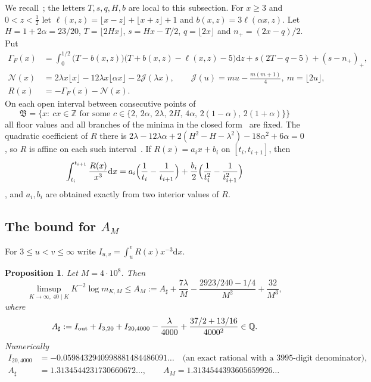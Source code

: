 \documentclass[11pt]{article}
\newtheorem{proposition}{Proposition}
\theoremstyle{remark}
\newcommand{\Z}{\mathbb{Z}}
\newcommand{\Q}{\mathbb{Q}}
\newcommand{\dd}{\mathrm{d}}
\begin{document}
We recall~\cite[(5.4)--(5.6)]{F}; the letters $T,s,q,H,b$ are local to this subsection. For $x\ge3$ and $0<z<\frac12$ let $\ell(x,z)=\lfloor x-z\rfloor+\lfloor x+z\rfloor+1$ and $b(x,z)=3\ell(\alpha x,z)$. Let $H=1+2\alpha=23/20$, $T=\lfloor2Hx\rfloor$, $s=Hx-T/2$, $q=\lfloor2x\rfloor$ and $n_+=(2x-q)/2$. Put
\begin{equation}\label{eq:Rdef}
\begin{aligned}
\Gamma_F(x)&=\int_0^{1/2}\bigl(T-b(x,z)\bigr)\bigl(T+b(x,z)-\ell(x,z)-5\bigr)\dd z+s(2T-q-5)+(s-n_+)_+,\\
\mathcal N(x)&=2\lambda x\lfloor x\rfloor-12\lambda x\lfloor\alpha x\rfloor-2\mathcal J(\lambda x),\qquad\mathcal J(u)=mu-\frac{m(m+1)}4,\ m=\lfloor2u\rfloor,\\
R(x)&=-\Gamma_F(x)-\mathcal N(x).
\end{aligned}
\end{equation}
On each open interval between consecutive points of
\[
\mathfrak B=\{x:\ cx\in\Z\text{ for some }c\in\{2,\,2\alpha,\,2\lambda,\,2H,\,4\alpha,\,2(1-\alpha),\,2(1+\alpha)\}\}
\]
all floor values and all branches of the minima in the closed form~\cite[(B.1)]{F} are fixed. The quadratic coefficient of $R$ there is $2\lambda-12\lambda\alpha+2(H^2-H-\lambda^2)-18\alpha^2+6\alpha=0$, so $R$ is affine on each such interval~\cite[App.~B.1]{F}. If $R(x)=a_ix+b_i$ on $[t_i,t_{i+1}]$, then
\begin{equation}\label{eq:B3}
\int_{t_i}^{t_{i+1}}\frac{R(x)}{x^3}\dd x=a_i\Bigl(\frac1{t_i}-\frac1{t_{i+1}}\Bigr)+\frac{b_i}2\Bigl(\frac1{t_i^2}-\frac1{t_{i+1}^2}\Bigr)
\end{equation}
\cite[(B.3)]{F}, and $a_i,b_i$ are obtained exactly from two interior values of $R$.

\subsection{The bound for $A_M$}

For $3\le u<v\le\infty$ write $I_{u,v}=\int_u^vR(x)x^{-3}\dd x$.

\begin{proposition}\label{prop:AM}
Let $M=4\cdot10^8$. Then
\[
\limsup_{K\to\infty,\ 40\mid K}K^{-2}\log m_{K,M}\le A_M:=A_\sharp+\frac{7\lambda}{M}-\frac{2923/240-1/4}{M^2}+\frac{32}{M^3},
\]
where
\[
A_\sharp:=I_{\rm out}+I_{3,20}+I_{20,4000}-\frac{\lambda}{4000}+\frac{37/2+13/16}{4000^2}\in\Q .
\]
Numerically
\begin{align*}
I_{20,4000}&=-0.0598432940998881484486091\ldots\quad\text{(an exact rational with a $3995$-digit denominator)},\\
A_\sharp&=1.3134544231730660672\ldots,\qquad A_M=1.3134544393605659926\ldots
\end{align*}
\end{proposition}
\end{document}
